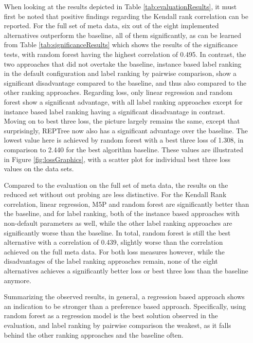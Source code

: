 When looking at the results depicted in Table \ref{tab:evaluationResults}, it must first be noted that positive findings regarding the Kendall rank correlation can be reported. For the full set of meta data, six out of the eight implemented alternatives outperform the baseline, all of them significantly, as can be learned from Table \ref{tab:significanceResults} which shows the results of the significance tests, with random forest having the highest correlation of 0.495. In contrast, the two approaches that did not overtake the baseline, instance based label ranking in the default configuration and label ranking by pairwise comparison, show a significant disadvantage compared to the baseline, and thus also compared to the other ranking approaches. Regarding loss, only linear regression and random forest show a significant advantage, with all label ranking approaches except for instance based label ranking having a significant disadvantage in contrast. Moving on to best three loss, the picture largely remains the same, except that surprisingly, REPTree now also has a significant advantage over the baseline. The lowest value here is achieved by random forest with a best three loss of 1.308, in comparison to 2.440 for the best algorithm baseline. These values are illustrated in Figure \ref{fig:lossGraphics}, with a scatter plot for individual best three loss values on the data sets.

Compared to the evaluation on the full set of meta data, the results on the reduced set without out probing are less distinctive. For the Kendall Rank correlation, linear regression, M5P and random forest are significantly better than the baseline, and for label ranking, both of the instance based approaches with non-default parameters as well, while the other label ranking approaches are significantly worse than the baseline. In total, random forest is still the best alternative with a correlation of 0.439, slightly worse than the correlation achieved on the full meta data. For both loss measures however, while the disadvantages of the label ranking approaches remain, none of the eight alternatives achieves a significantly better loss or best three loss than the baseline anymore.

Summarizing the observed results, in general, a regression based approach shows an indication to be stronger than a preference based approach. Specifically, using random forest as a regression model is the best solution observed in the evaluation, and label ranking by pairwise comparison the weakest, as it falls behind the other ranking approaches and the baseline often.

